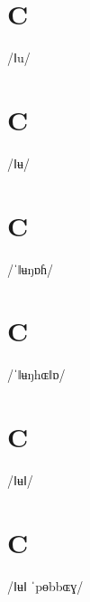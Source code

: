 \documentclass[10pt,a4paper,twoside]{book}
\begin{document}
\section*{C}

\begin{multicols}{3}
 {/ǁu/} {}
\end{multicols}

\section*{C}

\begin{multicols}{3}
 {/ǁʉ/} {}
\end{multicols}

\section*{C}

\begin{multicols}{3}
 {/ˈǁʉŋɒɦ/} {}
\end{multicols}

\section*{C}

\begin{multicols}{3}
 {/ˈǁʉŋhɶǁɒ/} {}
\end{multicols}

\section*{C}

\begin{multicols}{3}
 {/ǁʉǁ/} {}
\end{multicols}

\section*{C}

\begin{multicols}{3}
 {/ǁʉǁ ˈpɵbbɶɣ/} {}
\end{multicols}
\end{document}
